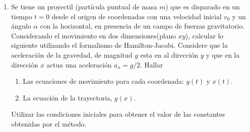 \documentclass[../main]{subfiles}
\begin{document}
\begin{enumerate}
\begin{enumerate}[label=(\alph*)]
    \end{enumerate}
    \item Se tiene un proyectil (partícula puntual de masa $m$) que es disparado en un tiempo $t=0$ desde el origen de coordenadas con una velocidad inicial $v_0$ y un ángulo $\alpha$ con la horizontal, en presencia de un campo de fuerzas gravitatorio. Considerando el movimiento en dos dimensiones(plano $xy$), calcular lo siguiente utilizando el formalismo de Hamilton-Jacobi. Considere que la aceleración de la gravedad, de magnitud $g$ esta en al dirección $y$ y que en la dirección $x$ actua una aceleración $a_x=g/2$. Hallar
    \begin{enumerate}[label=(\alph*)]
        \item Las ecuaciones de movimiento para cada coordenada: $y(t)$ y $x(t)$.
        \item La ecuación de la trayectoria, $y(x)$.
    \end{enumerate}
    Utilizar las condiciones iniciales para obtener el valor de las constantes obtenidas por el método.
\end{enumerate}
\end{document}
